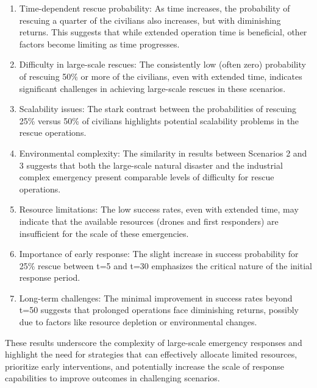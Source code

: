 \begin{enumerate}
	\item Time-dependent rescue probability: As time increases, the probability of rescuing a quarter of the civilians also increases, but with diminishing returns. This suggests that while extended operation time is beneficial, other factors become limiting as time progresses.
	
	\item Difficulty in large-scale rescues: The consistently low (often zero) probability of rescuing 50\% or more of the civilians, even with extended time, indicates significant challenges in achieving large-scale rescues in these scenarios.
	
	\item Scalability issues: The stark contrast between the probabilities of rescuing 25\% versus 50\% of civilians highlights potential scalability problems in the rescue operations.
	
	\item Environmental complexity: The similarity in results between Scenarios 2 and 3 suggests that both the large-scale natural disaster and the industrial complex emergency present comparable levels of difficulty for rescue operations.
	
	\item Resource limitations: The low success rates, even with extended time, may indicate that the available resources (drones and first responders) are insufficient for the scale of these emergencies.
	
	\item Importance of early response: The slight increase in success probability for 25\% rescue between t=5 and t=30 emphasizes the critical nature of the initial response period.
	
	\item Long-term challenges: The minimal improvement in success rates beyond t=50 suggests that prolonged operations face diminishing returns, possibly due to factors like resource depletion or environmental changes.
\end{enumerate}

These results underscore the complexity of large-scale emergency responses and highlight the need for strategies that can effectively allocate limited resources, prioritize early interventions, and potentially increase the scale of response capabilities to improve outcomes in challenging scenarios.
